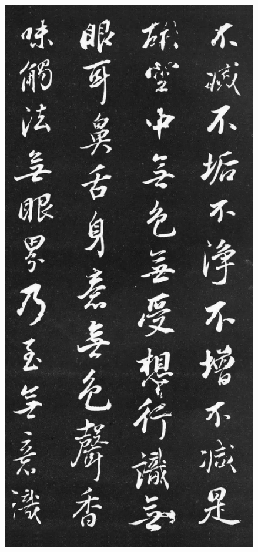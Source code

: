 \documentclass[a4paper,twoside]{article}
\begin{document}
\begin{figure}[ht]
\centering
\includegraphics[width=11.2cm]{images/dongqichang-3}
\end{figure}
\end{document}

